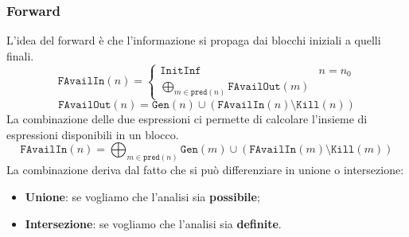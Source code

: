 \subsubsection{Forward}
L'idea del forward è che l'informazione si propaga dai blocchi iniziali a quelli finali.
\begin{equation}
    \texttt{FAvailIn}(n) = 
        \begin{cases}
            \texttt{InitInf} & n = n_0\\
            \bigoplus_{m \in \texttt{pred}(n)} \texttt{FAvailOut}(m)
        \end{cases}
\end{equation}
\begin{equation}
    \texttt{FAvailOut}(n) = \texttt{Gen}(n) \cup (\texttt{FAvailIn}(n) \setminus \texttt{Kill}(n))
\end{equation}
La combinazione delle due espressioni ci permette di calcolare l'insieme di espressioni disponibili in un blocco.
\begin{equation}
\texttt{FAvailIn}(n) = \bigoplus_{m \in \texttt{pred}(n)} \texttt{Gen}(m) \cup (\texttt{FAvailIn}(m)
\setminus \texttt{Kill}(m))
\end{equation}
La combinazione deriva dal fatto che si può differenziare in unione o intersezione:
\begin{itemize}
\item \textbf{Unione}: se vogliamo che l'analisi sia \textbf{possibile};
\item \textbf{Intersezione}: se vogliamo che l'analisi sia \textbf{definite}.
\end{itemize}

